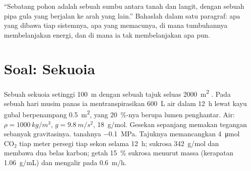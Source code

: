\begin{exercise}[$\star\star\star$]\label{exo:b1:plant-transport:12}
``Sebatang pohon adalah sebuah sumbu antara tanah dan langit, dengan
sebuah pipa gula yang berjalan ke arah yang lain.'' Bahaslah dalam satu
paragraf: apa yang dibawa tiap sistemnya, apa yang memacunya, di mana
tumbuhannya membelanjakan energi, dan di mana ia tak membelanjakan
apa pun.
\end{exercise}

\section{Soal: Sekuoia}

\begin{problem}
\label{pb:b1:plant-transport:1}
Sebuah sekuoia setinggi \qty{100}{m} dengan sebuah tajuk seluas
\qty{2000}{m^2} . Pada sebuah hari musim panas ia
mentranspirasikan \qty{600}{L} air dalam \qty{12}{h} lewat kayu gubal
berpenampang \qty{0.5}{m^2}, yang \qty{20}{\%}-nya berupa lumen
penghantar. Air: $\rho = \qty{1000}{kg/m^3}$, $g =
\qty{9.8}{m/s^2}$, \qty{18}{g/mol}. Gesekan sepanjang  memakan
tegangan sebanyak gravitasinya.  tanahnya \qty{-0.1}{MPa}.
Tajuknya memancangkan \qty{4}{\micro mol} $\mathrm{CO_2}$ tiap meter
persegi  tiap sekon selama \qty{12}{h}; sukrosa \qty{342}{g/mol}
dan membawa dua belas karbon; getah  \qty{15}{\%} sukrosa
menurut massa (kerapatan \qty{1.06}{g/mL}) dan mengalir pada
\qty{0.6}{m/h}.


\end{problem}

